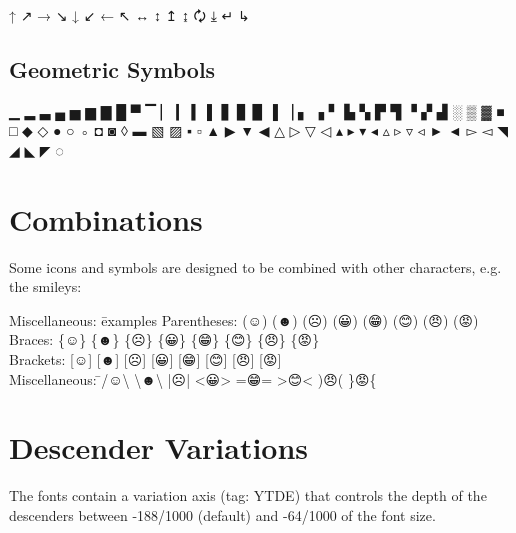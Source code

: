 ↑ ↗ → ↘ ↓ ↙ ← ↖ ↔ ↕ ↥ ↨ 🗘 ⤓ ↵ ↳

\subsection{Geometric Symbols}

▁ ▂ ▃ ▄ ▅ ▆ ▇ █ ▀ ▔ ▏ ▎ ▍ ▌ ▋ ▊ ▉ ▐ ▕ ▖ ▗ ▘ ▙ ▚ ▛ ▜ ▝ ▞ ▟ ░ ▒ ▓ ■ □ ◆ ◇ ● ○ ◦ ◘ ◙ ◊ ▬ ▧ ▨ ▪ ▫ ▲ ▶ ▼ ◀ △ ▷ ▽ ◁ ▴ ▸ ▾ ◂ ▵ ▹ ▿ ◃ ► ◄ ▻ ◅ ◥ ◢ ◣ ◤ ◌

\section{Combinations}

Some icons and symbols are designed to be combined with other characters, e.g. the smileys:

\begin{tabbing}
	Miscellaneous: \= examples \kill
	Parentheses: \> \large (☺) (☻) (☹) (😀) (😁) (😊) (😠) (😡) \\
	Braces:      \> \large \{☺\} \{☻\} \{☹\} \{😀\} \{😁\} \{😊\} \{😠\} \{😡\} \\
	Brackets:    \> \large [☺] [☻] [☹] [😀] [😁] [😊] [😠] [😡] \\
	Miscellaneous: \= \large /☺\textbackslash{} \textbackslash ☻\textbackslash{} |☹| <😀> =😁=  >😊< )😠( \}😡\{ \\
\end{tabbing}

\section{Descender Variations}

The fonts contain a variation axis (tag: YTDE) that controls the depth of the descenders between {-188/1000} (default) and {-64/1000} of the font size.



